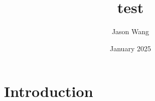 \documentclass{article}
\title{test}
\author{Jason Wang}
\date{January 2025}
\begin{document}
\maketitle

\section{Introduction}
\end{document}
